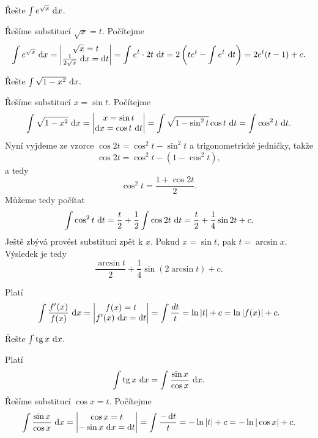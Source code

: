 \begin{priklad}
Řešte $\int e^{\sqrt{x} } \, \mathop{}\!\mathrm{d} x$.
\end{priklad}

\begin{reseni}
Řešíme substitucí $\sqrt{x}=t $. Počítejme
$$
    \int e^{\sqrt{x} } \, \mathop{}\!\mathrm{d} x = \begin{vmatrix}
    \sqrt{x} = t \\
    \frac{1}{2 \sqrt{x}} \, \mathop{}\!\mathrm{d} x = \mathop{}\!\mathrm{d} t
    \end{vmatrix} = \int e^t \cdot 2t \, \mathop{}\!\mathrm{d} t = 2 \left( te^t - \int e^t \, \mathop{}\!\mathrm{d} t \right ) = 2 e^t (t-1) + c.
$$
\end{reseni}

\begin{priklad}
Řešte $\int \sqrt{1-x^2} \, \mathop{}\!\mathrm{d} x.$
\end{priklad}

\begin{reseni}
Řešíme substitucí $x=\sin t$. Počítejme
$$
    \int \sqrt{1-x^2} \, \mathop{}\!\mathrm{d} x = \begin{vmatrix}
        x = \sin t \\
        \mathop{}\!\mathrm{d} x = \cos t \, \mathop{}\!\mathrm{d} t
    \end{vmatrix} = \int \sqrt{1 - \sin^2 t} \cos t \, \mathop{}\!\mathrm{d} t = \int \cos^2 t \, \mathop{}\!\mathrm{d} t.
$$
Nyní vyjdeme ze vzorce $\cos 2t = \cos^2 t  - \sin^2 t$ a trigonometrické jedničky, takže
$$
    \cos 2 t = \cos ^2 t  - \left( 1 - \cos ^2 t \right ) ,
$$
a tedy
$$
    \cos^2 t  = \frac{1+ \cos 2t}{2}.
$$
Můžeme tedy počítat
$$
    \int \cos^2 t \, \mathop{}\!\mathrm{d} t =\frac{t}{2} +\frac{1}{2}\int \cos 2 t \, \mathop{}\!\mathrm{d} t = \frac{t }{2} + \frac{1}{4} \sin 2t  + c .
$$
Ještě zbývá provést substituci zpět k $x$. Pokud $x = \sin t$, pak $t = \arcsin x$. Výsledek je tedy
$$
\frac{\arcsin t}{2} + \frac{1}{4} \sin (2 \arcsin t)+ c.
$$
\end{reseni}

\begin{pozn}
    Platí
    $$\int \frac{f^\prime(x)}{f(x)}\, \mathop{}\!\mathrm{d} x=\begin{vmatrix}
        f(x)=t \\
        f^\prime(x) \, \mathop{}\!\mathrm{d} x = \mathop{}\!\mathrm{d} t
    \end{vmatrix}=\int \frac{dt}{t}=\operatorname{ln} |t|+c=\operatorname{ln} |f(x)|+c.$$
\end{pozn}

\begin{priklad}
Řešte $\int \operatorname{tg} x\, \mathop{}\!\mathrm{d} x.$
\end{priklad}

\begin{reseni}
Platí
$$\int \operatorname{tg} x\, \mathop{}\!\mathrm{d} x=\int \frac{\sin x}{\cos x}\, \mathop{}\!\mathrm{d} x.$$
Řešíme substitucí $\cos x=t.$ Počítejme
$$
    \int \frac{\sin x }{\cos x}\, \mathop{}\!\mathrm{d} x = \begin{vmatrix}
	\cos x = t \\
	-\sin x \, \mathop{}\!\mathrm{d} x = \mathop{}\!\mathrm{d} t
    \end{vmatrix} = \int \frac{-\mathop{}\!\mathrm{d} t }{t} = -\operatorname{ln} |t| + c = -\operatorname{ln} |\cos x| + c.
$$
\end{reseni}

